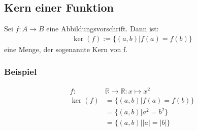 \subsection{Kern einer Funktion}
Sei $f:{A}\longrightarrow{B}$ eine Abbildungsvorschrift.
Dann ist:
\begin{align*}
   \ker(f) := \{(a,b) | f(a)=f(b)\} %
\end{align*}
eine Menge, der sogenannte Kern von f.
\subsubsection{Beispiel}
\begin{align*}
  f: &\mathbb{R} \rightarrow \mathbb{R} : {x}\longmapsto{x^2} \\
  \ker(f) &= \{(a,b) | f(a)=f(b) \} \\
         &= \{ (a,b) | a^2 = b^2 \} \\
         &= \{ (a,b) | |a| =|b| \}
\end{align*}

